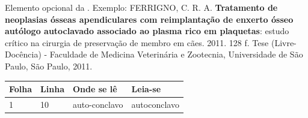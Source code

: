 \documentclass[
	12pt,				
	openright,		
	twoside,	
	a4paper,
	english,	
	brazil	
	]{abntex2}
\begin{document}
\frenchspacing 
\imprimircapa
\imprimirfolhaderosto*
\begin{fichacatalografica}
	\sffamily
	\vspace*{\fill}
	\begin{center}
	\end{center}
\end{fichacatalografica}
\begin{errata}
Elemento opcional da . Exemplo:
\vspace{\onelineskip}
FERRIGNO, C. R. A. \textbf{Tratamento de neoplasias ósseas apendiculares com
reimplantação de enxerto ósseo autólogo autoclavado associado ao plasma
rico em plaquetas}: estudo crítico na cirurgia de preservação de membro em
cães. 2011. 128 f. Tese (Livre-Docência) - Faculdade de Medicina Veterinária e
Zootecnia, Universidade de São Paulo, São Paulo, 2011.
\begin{table}[htb]
\center
\footnotesize
\begin{tabular}{|p{1.4cm}|p{1cm}|p{3cm}|p{3cm}|}
  \hline
   \textbf{Folha} & \textbf{Linha}  & \textbf{Onde se lê}  & \textbf{Leia-se}  \\
    \hline
    1 & 10 & auto-conclavo & autoconclavo\\
   \hline
\end{tabular}
\end{table}
\end{errata}
\end{document}
